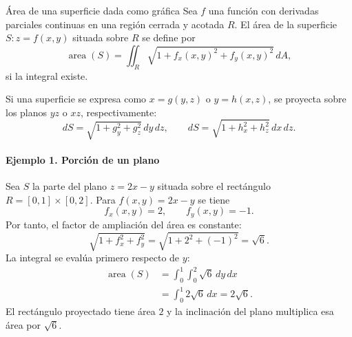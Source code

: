 \newpage
\begin{mydefinition}{Área de una superficie dada como gráfica}
Sea $f$ una función con derivadas parciales continuas en una región cerrada y acotada $R$. El área de la superficie $S:z=f(x,y)$ situada sobre $R$ se define por
\[
\operatorname{area}(S)
=\iint_R\sqrt{1+f_x(x,y)^2+f_y(x,y)^2}\,dA,
\]
si la integral existe.
\end{mydefinition}

Si una superficie se expresa como $x=g(y,z)$ o $y=h(x,z)$, se proyecta sobre los planos $yz$ o $xz$, respectivamente:
\[
dS=\sqrt{1+g_y^2+g_z^2}\,dy\,dz,
\qquad
dS=\sqrt{1+h_x^2+h_z^2}\,dx\,dz.
\]

\paragraph{Ejemplo 1. Porción de un plano}
Sea $S$ la parte del plano $z=2x-y$ situada sobre el rectángulo $R=[0,1]\times[0,2]$. Para $f(x,y)=2x-y$ se tiene
\[
f_x(x,y)=2,
\qquad
f_y(x,y)=-1.
\]
Por tanto, el factor de ampliación del área es constante:
\[
\sqrt{1+f_x^2+f_y^2}=\sqrt{1+2^2+(-1)^2}=\sqrt6.
\]
La integral se evalúa primero respecto de $y$:
\begin{align*}
\operatorname{area}(S)
&=\int_0^1\int_0^2\sqrt6\,dy\,dx\\
&=\int_0^1 2\sqrt6\,dx
=2\sqrt6.
\end{align*}
El rectángulo proyectado tiene área $2$ y la inclinación del plano multiplica esa área por $\sqrt6$.

\begingroup\shorthandoff{>}
\begin{center}
\end{center}
\endgroup

